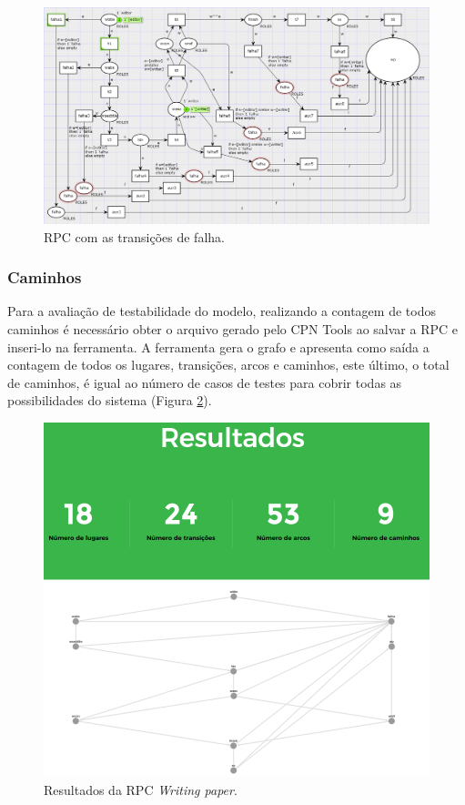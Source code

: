 \begin{figure}
\centering
\includegraphics[scale=0.65]{imagens/5-implementacao1.png}
\caption{RPC com as transições de falha.}
\label{fig:5rpcfinal1}
\end{figure}

\subsubsection{Caminhos}

Para a avaliação de testabilidade do modelo, realizando a contagem de todos caminhos é necessário obter o arquivo gerado pelo CPN Tools ao salvar a RPC e inseri-lo na ferramenta. A ferramenta gera o grafo e apresenta como saída a contagem de todos os lugares, transições, arcos e caminhos, este último, o total de caminhos, é igual ao número de casos de testes para cobrir todas as possibilidades do sistema (Figura \ref{fig:5-resultado1}).

\begin{figure}[ht]
\centering
\includegraphics[scale=0.3]{imagens/5-resultado1.png}
\caption{Resultados da RPC \textit{Writing paper}.}
\label{fig:5-resultado1}
\end{figure}
    
